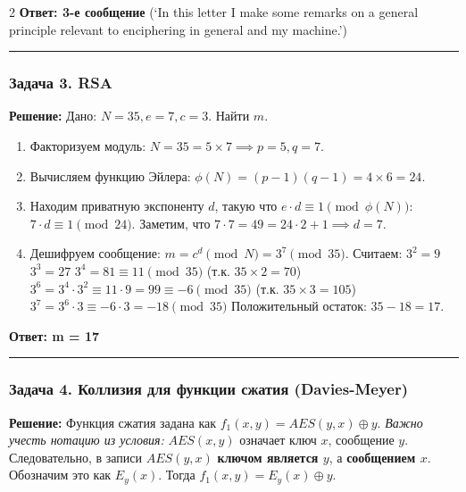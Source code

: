 ﻿\documentclass[10pt,a4paper,landscape]{extarticle}
\newcommand{\tightlist}{}
\begin{document}
\begin{multicols*}{2}
\textbf{Ответ: 3-е сообщение} (`In this letter I make some remarks on a general principle relevant to enciphering in general and my machine.')

\begin{center}\rule{0.5\linewidth}{0.5pt}\end{center}

\subsubsection{Задача 3. RSA}\label{ux437ux430ux434ux430ux447ux430-3.-rsa}

\textbf{Решение:} Дано: \(N=35, e=7, c=3\). Найти \(m\).

\begin{enumerate}
\def\labelenumi{\arabic{enumi}.}
\tightlist
\item
  Факторизуем модуль: \(N = 35 = 5 \times 7 \implies p=5, q=7\).
\item
  Вычисляем функцию Эйлера: \(\phi(N) = (p-1)(q-1) = 4 \times 6 = 24\).
\item
  Находим приватную экспоненту \(d\), такую что \(e \cdot d \equiv 1 \pmod{\phi(N)}\): \(7 \cdot d \equiv 1 \pmod{24}\). Заметим, что \(7 \cdot 7 = 49 = 24 \cdot 2 + 1 \implies d = 7\).
\item
  Дешифруем сообщение: \(m = c^d \pmod N = 3^7 \pmod{35}\). Считаем: \(3^2 = 9\) \(3^3 = 27\) \(3^4 = 81 \equiv 11 \pmod{35}\) (т.к. \(35 \times 2 = 70\)) \(3^6 = 3^4 \cdot 3^2 \equiv 11 \cdot 9 = 99 \equiv -6 \pmod{35}\) (т.к. \(35 \times 3 = 105\)) \(3^7 = 3^6 \cdot 3 \equiv -6 \cdot 3 = -18 \pmod{35}\) Положительный остаток: \(35 - 18 = 17\).
\end{enumerate}

\textbf{Ответ: m = 17}

\begin{center}\rule{0.5\linewidth}{0.5pt}\end{center}

\subsubsection{Задача 4. Коллизия для функции сжатия (Davies-Meyer)}\label{ux437ux430ux434ux430ux447ux430-4.-ux43aux43eux43bux43bux438ux437ux438ux44f-ux434ux43bux44f-ux444ux443ux43dux43aux446ux438ux438-ux441ux436ux430ux442ux438ux44f-davies-meyer}

\textbf{Решение:} Функция сжатия задана как \(f_1(x,y) = AES(y,x) \oplus y\). \emph{Важно учесть нотацию из условия:} \(AES(x,y)\) означает ключ \(x\), сообщение \(y\). Следовательно, в записи \(AES(y,x)\) \textbf{ключом является \(y\)}, а \textbf{сообщением \(x\)}. Обозначим это как \(E_y(x)\). Тогда \(f_1(x,y) = E_y(x) \oplus y\).


\end{multicols*}
\end{document}

